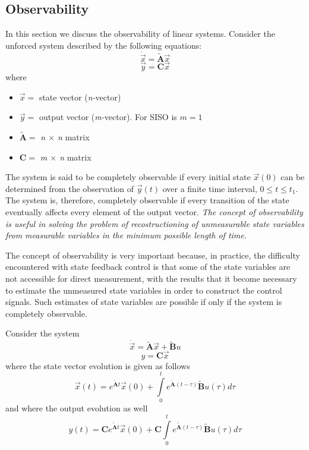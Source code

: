 \documentclass[12pt,a4paper,oneside]{book}
\begin{document}
\begin{onehalfspace}
\section{Observability}
In this section we discuss the observability of linear systems. Consider the 
unforced system described by the following equations:
\begin{equation}\label{state_observer_eq_1}
	\dot{\vec x} = \tilde{\mathbf{A}} \vec x 
\end{equation}
\begin{equation}\label{state_observer_eq_2}
	\vec y = \mathbf{C} \vec x 
\end{equation}
where	\begin{itemize} 
	\item $\vec x = $ state vector (\textit{n-}vector)
	\item $\vec y = $ output vector (\textit{m-}vector). For SISO is $m=1$
	\item $ \tilde{\mathbf{A}} = $ \textit{n $\times$ n} matrix
	\item $ \mathbf{C} = $ \textit{m $\times$ n} matrix
\end{itemize}
The system is said to be completely observable if every initial state $\vec 
x(0)$ can be determined from the observation of $\vec y(t)$ over a finite time 
interval, $0 \leq t \leq t_1$. The system is, therefore, completely observable 
if every transition of the state eventually affects every element of the output 
vector. \textit{The concept of observability is useful in solving the problem 
of recostructioning of unmeasurable state variables from measurable variables 
in the minimum possible length of time.} 

The concept of observability is very important because, in practice, the 
difficulty encountered with state feedback control is that some of the state 
variables are not accessible for direct measurement, with the results that it 
become necessary to estimate the unmeasured state variables in order to 
construct the control signals. Such estimates of state variables are possible 
if only if the system is completely observable.

Consider the system
\begin{equation}
	\dot{\vec x} = \tilde{\mathbf{A}} \vec{x} + \tilde{\mathbf{B}} u
\end{equation}
\begin{equation}
y = \mathbf{C} \vec{x}
\end{equation}
where the state vector evolution is given as follows
\begin{equation}
	\vec x(t) = e^{\tilde{\mathbf{A}}t} \vec{x}(0) + \int\limits_0^t 
	e^{\tilde{\mathbf{A}}(t-\tau)}\tilde{\mathbf{B}} u(\tau)d\tau
\end{equation}
and where the output evolution as well
\begin{equation}
	y(t) = \mathbf{C}e^{\tilde{\mathbf{A}}t} \vec x(0) + 
	\mathbf{C}\int\limits_0^t 
	e^{\tilde{\mathbf{A}}(t-\tau)}\tilde{\mathbf{B}} u(\tau)d\tau
\end{equation}


\end{onehalfspace}
\end{document}
